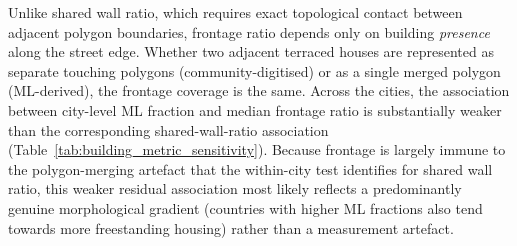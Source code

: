 Unlike shared wall ratio, which requires exact topological contact between adjacent polygon boundaries, frontage ratio depends only on building \emph{presence} along the street edge. Whether two adjacent terraced houses are represented as separate touching polygons (community-digitised) or as a single merged polygon (ML-derived), the frontage coverage is the same. Across the \NCitiesTotal{} cities, the association between city-level ML fraction and median frontage ratio is substantially weaker than the corresponding shared-wall-ratio association (Table~\ref{tab:building_metric_sensitivity}). Because frontage is largely immune to the polygon-merging artefact that the within-city test identifies for shared wall ratio, this weaker residual association most likely reflects a predominantly genuine morphological gradient (countries with higher ML fractions also tend towards more freestanding housing) rather than a measurement artefact.
